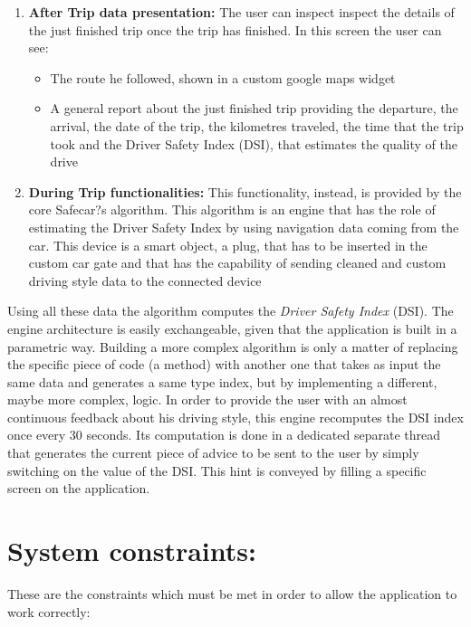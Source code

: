 \begin{enumerate}
	\item \textbf{After Trip data presentation:} The user can inspect inspect the details of the just finished trip once the trip has finished. In this screen the user can see:
	\begin{itemize}
		\item The route he followed, shown in a custom google maps widget
		\item A general report about the just finished trip providing the departure, the arrival, the date of the trip, the kilometres traveled, the time that the trip took and the Driver Safety Index (DSI), that estimates the quality of the drive
	\end{itemize}
	\item \textbf{During Trip functionalities:} This functionality, instead, is provided by the core Safecar?s algorithm. This algorithm is an engine that has the role of estimating the Driver Safety Index by using navigation data coming from the car. This device is a smart object, a plug, that has to be inserted in the custom car gate and that has the capability of sending cleaned and custom driving style data to the connected device
\end{enumerate}
Using all these data the algorithm computes the \textit{Driver Safety Index} (DSI). The engine architecture is easily exchangeable, given that the application is built in a parametric way. Building a more complex algorithm is only a matter of replacing the specific piece of code (a method) with another one that takes as input the same data and generates a same type index, but by implementing a different, maybe more complex, logic.
In order to provide the user with an almost continuous feedback about his driving style, this engine recomputes the DSI index once every 30 seconds.
Its computation is done in a dedicated separate thread that generates the current piece of advice to be sent to the user by simply switching on the value of the DSI. This hint is conveyed by filling a specific screen on the application.

\clearpage
\section{System constraints:}
These are the constraints which must be met in order to allow the application to work correctly:

